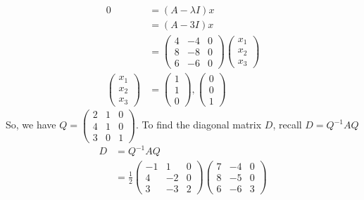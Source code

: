 \documentclass[13pt]{article}
\begin{document}
\begin{enumerate}[label=(\alph*),leftmargin=*]
\begin{align*}
    0 &= (A - \lambda I)x \\
      &= (A - 3I)x \\
      &=
        \begin{pmatrix}
          4 & -4 & 0 \\
          8 & -8 & 0 \\
          6 & -6 & 0
        \end{pmatrix}
        \begin{pmatrix}
          x_1 \\
          x_2 \\
          x_3
        \end{pmatrix} \\
    \begin{pmatrix}
      x_1 \\
      x_2 \\
      x_3
    \end{pmatrix} &=
                    \begin{pmatrix}
                      1 \\
                      1 \\
                      0
                    \end{pmatrix},
                    \begin{pmatrix}
                      0 \\
                      0 \\
                      1
                    \end{pmatrix}
  \end{align*}
  So, we have $Q =
  \begin{pmatrix}
    2 & 1 & 0 \\
    4 & 1 & 0 \\
    3 & 0 & 1 
  \end{pmatrix}$. To find the diagonal matrix $D$, recall $D = Q^{-1}AQ$
  \begin{align*}
    D &= Q^{-1}AQ \\
      &= \frac{1}{2}
        \begin{pmatrix}
          -1 & 1 & 0 \\
          4 & -2 & 0 \\
          3 & -3 & 2
        \end{pmatrix}
        \begin{pmatrix}
          7 & -4 & 0 \\
          8 & -5 & 0 \\
          6 & -6 & 3
        \end{pmatrix}

\end{align*}
\end{enumerate}
\end{document}
